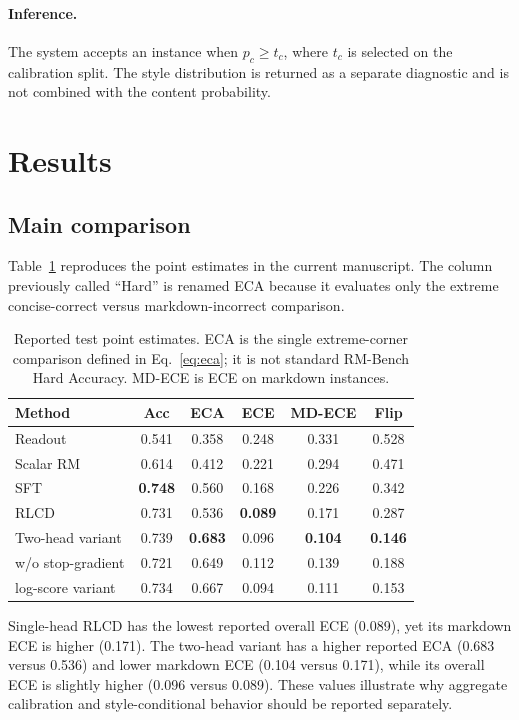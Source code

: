 \documentclass[letterpaper]{article} %
\begin{document}
\paragraph{Inference.}
The system accepts an instance when $p_c\geq t_c$, where $t_c$ is selected on the calibration split. The style distribution is returned as a separate diagnostic and is not combined with the content probability.

\section{Results}

\subsection{Main comparison}

Table~\ref{tab:main} reproduces the point estimates in the current manuscript. The column previously called ``Hard'' is renamed ECA because it evaluates only the extreme concise-correct versus markdown-incorrect comparison.

\begin{table}[t]
\centering
\small
\setlength{\tabcolsep}{3.2pt}
\begin{tabular}{lccccc}
\toprule
Method & Acc & ECA & ECE & MD-ECE & Flip \\
\midrule
Readout & 0.541 & 0.358 & 0.248 & 0.331 & 0.528 \\
Scalar RM & 0.614 & 0.412 & 0.221 & 0.294 & 0.471 \\
SFT & \textbf{0.748} & 0.560 & 0.168 & 0.226 & 0.342 \\
RLCD & 0.731 & 0.536 & \textbf{0.089} & 0.171 & 0.287 \\
Two-head variant & 0.739 & \textbf{0.683} & 0.096 & \textbf{0.104} & \textbf{0.146} \\
\midrule
\quad w/o stop-gradient & 0.721 & 0.649 & 0.112 & 0.139 & 0.188 \\
\quad log-score variant & 0.734 & 0.667 & 0.094 & 0.111 & 0.153 \\
\bottomrule
\end{tabular}
\caption{Reported test point estimates. ECA is the single extreme-corner comparison defined in Eq.~\ref{eq:eca}; it is not standard RM-Bench Hard Accuracy. MD-ECE is ECE on markdown instances.}
\label{tab:main}
\end{table}

Single-head RLCD has the lowest reported overall ECE (0.089), yet its markdown ECE is higher (0.171). The two-head variant has a higher reported ECA (0.683 versus 0.536) and lower markdown ECE (0.104 versus 0.171), while its overall ECE is slightly higher (0.096 versus 0.089). These values illustrate why aggregate calibration and style-conditional behavior should be reported separately.
\end{document}
